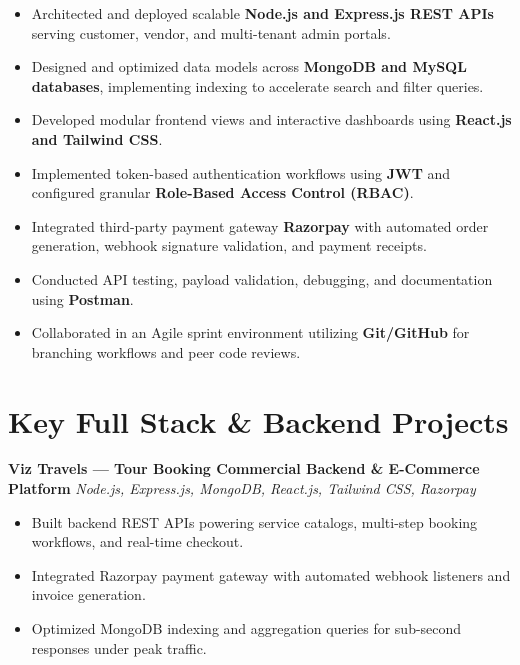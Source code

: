 \documentclass[a4paper,10pt]{article}
\begin{document}
\begin{itemize}

    \item Architected and deployed scalable \textbf{Node.js and Express.js REST APIs} serving customer, vendor, and multi-tenant admin portals.

    \item Designed and optimized data models across \textbf{MongoDB and MySQL databases}, implementing indexing to accelerate search and filter queries.

    \item Developed modular frontend views and interactive dashboards using \textbf{React.js and Tailwind CSS}.

    \item Implemented token-based authentication workflows using \textbf{JWT} and configured granular \textbf{Role-Based Access Control (RBAC)}.

    \item Integrated third-party payment gateway \textbf{Razorpay} with automated order generation, webhook signature validation, and payment receipts.

    \item Conducted API testing, payload validation, debugging, and documentation using \textbf{Postman}.

    \item Collaborated in an Agile sprint environment utilizing \textbf{Git/GitHub} for branching workflows and peer code reviews.

\end{itemize}

\section*{Key Full Stack \& Backend Projects}

\textbf{Viz Travels --- Tour Booking Commercial Backend \& E-Commerce Platform}
\hfill
\textit{Node.js, Express.js, MongoDB, React.js, Tailwind CSS, Razorpay}

\begin{itemize}

    \item Built backend REST APIs powering service catalogs, multi-step booking workflows, and real-time checkout.

    \item Integrated Razorpay payment gateway with automated webhook listeners and invoice generation.

    \item Optimized MongoDB indexing and aggregation queries for sub-second responses under peak traffic.

\end{itemize}
\end{document}
